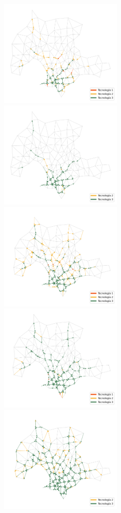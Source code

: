 \begin{figure}[h!]
  \centering
  \includegraphics[width=6cm]{../resources/montevideo_d5000.0_linear_0.4_budget_factor.png}
  \includegraphics[width=6cm]{../resources/montevideo_d5000.0_inv_logit_0.4_budget_factor.png}
  \includegraphics[width=6cm]{../resources/montevideo_d5000.0_linear.png}
  \includegraphics[width=6cm]{../resources/montevideo_d5000.0_inv_logit.png}
  \includegraphics[width=6cm]{../resources/montevideo_d5000.0_linear_1.6_budget_factor.png}

\end{figure}
